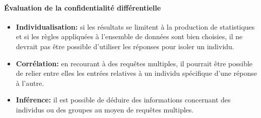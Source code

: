 \paragraph{Évaluation de la confidentialité différentielle}
\begin{itemize}
    \item \textbf{Individualisation:} si les résultats se limitent à la production de statistiques et si les règles appliquées à l’ensemble de données sont bien choisies, il ne devrait pas être possible d’utiliser les réponses pour isoler un individu. 

    \item \textbf{Corrélation:} en recourant à des requêtes multiples, il pourrait être possible de relier entre elles les entrées relatives à un individu spécifique d’une réponse à l’autre. 

    \item \textbf{Inférence:} il est possible de déduire des informations concernant des individus ou des groupes au moyen de requêtes multiples. 
\end{itemize}